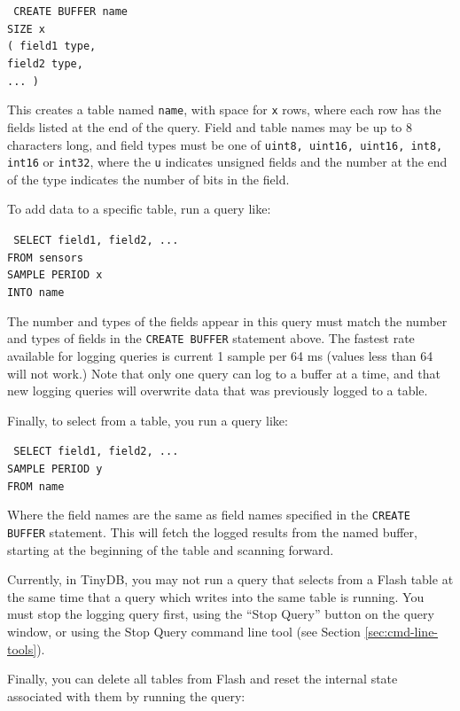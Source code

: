 \documentclass[11pt]{article}
\renewcommand{\baselinestretch}{1.2}
\newcommand{\sqlquery}[1]{
{\renewcommand\baselinestretch{.8}\rm
\begin{samepage}
\setlength{\parskip}{.1\baselineskip} 
\small
\hspace{.3in}\parbox[t]{5in}{\setlength{\parindent}{-.1in}\tt{#1}\\}
\normalsize
\renewcommand\baselinestretch{1.0}\rm
\end{samepage}
}}
\begin{document}
\sqlquery{
  CREATE BUFFER name \\
  SIZE x \\
  ( field1 type, \\
    field2 type, \\
    ... )
}

This creates a table named {\tt name}, with space for {\tt x} rows, where each row has
the fields listed at the end of the query.  Field and table names may be up to 8 characters
long, and field types must be one of {\tt uint8, uint16, uint16, int8, int16} or {\tt int32},
where the {\tt u} indicates unsigned fields and the number at the end of the type indicates
the number of bits in the field.

To add data to a specific table, run a query like:

\sqlquery {
  SELECT field1, field2, ... \\
  FROM sensors \\
  SAMPLE PERIOD x  \\
  INTO name
}

The number and types of the fields appear in this query must match the number and types
of fields in the {\tt CREATE BUFFER} statement above.  The fastest rate available for logging
queries is current 1 sample per 64 ms (values less than 64 will not work.)  Note that only one
query can log to a buffer at a time, and that new logging queries will overwrite data that
was previously logged to a table.


Finally, to select from a table, you run a query like:

\sqlquery{
  SELECT field1, field2, ... \\
  SAMPLE PERIOD y \\
  FROM name
}

Where the field names are the same as field names specified in the
{\tt CREATE BUFFER} statement. This will fetch the logged results from
the named buffer, starting at the beginning of the table and scanning
forward.

Currently, in TinyDB, you may not run a query that selects from a
Flash table at the same time that a query which writes into the same
table is running.  You must stop the logging query first, using the
``Stop Query'' button on the query window, or using the Stop Query
command line tool (see Section \ref{sec:cmd-line-tools}).

Finally, you can delete all tables from Flash and reset the internal state associated
with them by running the query:
\end{document}
